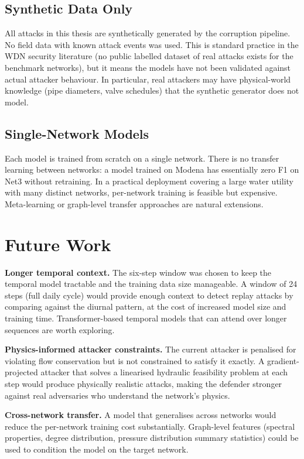 \subsection{Synthetic Data Only}

All attacks in this thesis are synthetically generated by the
corruption pipeline. No field data with known attack events was
used. This is standard practice in the WDN security
literature (no public labelled dataset of real attacks exists for
the benchmark networks), but it means the models have not been
validated against actual attacker behaviour. In particular, real
attackers may have physical-world knowledge (pipe diameters, valve
schedules) that the synthetic generator does not model.

\subsection{Single-Network Models}

Each model is trained from scratch on a single network. There is no
transfer learning between networks: a model trained on Modena has
essentially zero F1 on Net3 without retraining. In a practical
deployment covering a large water utility with many distinct
networks, per-network training is feasible but expensive.
Meta-learning or graph-level transfer approaches are natural
extensions.

\section{Future Work}
\label{sec:future}

\textbf{Longer temporal context.} The six-step window was chosen to
keep the temporal model tractable and the training data size manageable.
A window of 24 steps (full daily cycle) would provide enough context
to detect replay attacks by comparing against the diurnal pattern,
at the cost of increased model size and training time. Transformer-based
temporal models that can attend over longer sequences are worth
exploring.

\textbf{Physics-informed attacker constraints.} The current attacker
is penalised for violating flow conservation but is not constrained
to satisfy it exactly. A gradient-projected attacker that solves a
linearised hydraulic feasibility problem at each step would produce
physically realistic attacks, making the defender stronger against
real adversaries who understand the network's physics.

\textbf{Cross-network transfer.} A model that generalises across
networks would reduce the per-network training cost substantially.
Graph-level features (spectral properties, degree distribution,
pressure distribution summary statistics) could be used to condition
the model on the target network.

